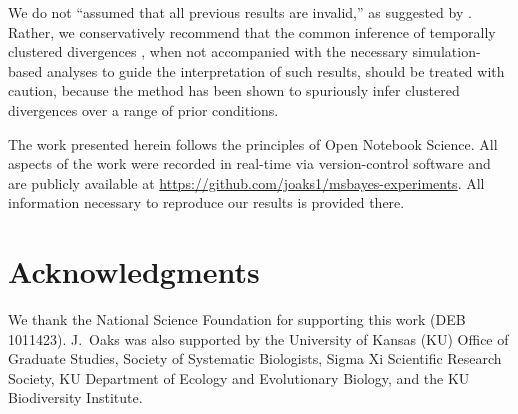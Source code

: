 \documentclass[letterpaper,12pt]{article}
\begin{document}
\begin{linenumbers}

We do not ``assumed that all previous \msb results are invalid,'' as suggested
by \citet{Hickerson2013}.
Rather, we conservatively recommend that the common inference of temporally
clustered divergences \citep{Barber2010, Bell2012, Carnaval2009, Chan2011,
Daza2010, Hickerson2006, Huang2011, Lawson2010, Leache2007, Plouviez2009,
Stone2012, Voje2009}, when not accompanied with the necessary simulation-based
analyses to guide the interpretation of such results, should be treated with
caution, because the method has been shown to spuriously infer clustered
divergences over a range of prior conditions.

The work presented herein follows the principles of Open Notebook Science.
All aspects of the work were recorded in real-time via version-control
software and are publicly available at
\href{https://github.com/joaks1/msbayes-experiments}{https://github.com/joaks1/msbayes-experiments}.
All information necessary to reproduce our results is provided there.


\section*{Acknowledgments}
We thank the National Science Foundation for supporting this work (DEB
1011423).
J.\ Oaks was also supported by the University of Kansas (KU) Office of Graduate
Studies, Society of Systematic Biologists, Sigma Xi Scientific Research
Society, KU Department of Ecology and Evolutionary Biology, and the KU
Biodiversity Institute.


% 

\newpage
\singlespacing

\renewcommand\listfigurename{Figure Captions}
\renewcommand\cftdotsep{\cftnodots}
\setlength\cftbeforefigskip{10pt}
\listoffigures


\end{linenumbers}

\newpage
\singlespacing



\clearpage

\newpage
\end{document}
